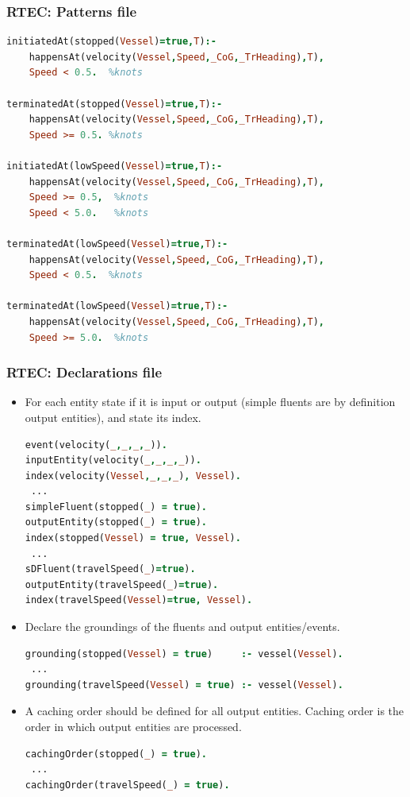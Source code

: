 \documentclass{beamer}
\begin{document}

\begin{frame}[fragile]
\frametitle{RTEC: Patterns file}

\begin{lstlisting}[language=Prolog, basicstyle=\tiny,]
initiatedAt(stopped(Vessel)=true,T):-
    happensAt(velocity(Vessel,Speed,_CoG,_TrHeading),T),
    Speed < 0.5.  %knots

terminatedAt(stopped(Vessel)=true,T):-
    happensAt(velocity(Vessel,Speed,_CoG,_TrHeading),T),
    Speed >= 0.5. %knots

initiatedAt(lowSpeed(Vessel)=true,T):-
    happensAt(velocity(Vessel,Speed,_CoG,_TrHeading),T),
    Speed >= 0.5,  %knots
    Speed < 5.0.   %knots

terminatedAt(lowSpeed(Vessel)=true,T):-
    happensAt(velocity(Vessel,Speed,_CoG,_TrHeading),T),
    Speed < 0.5.  %knots

terminatedAt(lowSpeed(Vessel)=true,T):-
    happensAt(velocity(Vessel,Speed,_CoG,_TrHeading),T),
    Speed >= 5.0.  %knots
\end{lstlisting}
\end{frame}


\begin{frame}[fragile]
\frametitle{RTEC: Declarations file}
\footnotesize
\begin{itemize}
\item For each entity state if it is input or output (simple fluents are by definition output entities), and state its index.
\begin{lstlisting}[language=Prolog, basicstyle=\tiny,]
event(velocity(_,_,_,_)).
inputEntity(velocity(_,_,_,_)).
index(velocity(Vessel,_,_,_), Vessel).
 ...
simpleFluent(stopped(_) = true).
outputEntity(stopped(_) = true).
index(stopped(Vessel) = true, Vessel).
 ...
sDFluent(travelSpeed(_)=true).
outputEntity(travelSpeed(_)=true).
index(travelSpeed(Vessel)=true, Vessel).
\end{lstlisting}
\pause
\item Declare the groundings of the fluents and output entities/events.
\begin{lstlisting}[language=Prolog, basicstyle=\tiny,]
grounding(stopped(Vessel) = true)     :- vessel(Vessel).
 ...
grounding(travelSpeed(Vessel) = true) :- vessel(Vessel).
\end{lstlisting}
\pause
\item A caching order should be defined for all output entities. Caching order is the order in which output entities are processed.
\begin{lstlisting}[language=Prolog, basicstyle=\tiny,]
cachingOrder(stopped(_) = true).
 ...
cachingOrder(travelSpeed(_) = true).
\end{lstlisting}
\end{itemize}
\end{frame}
\end{document}
